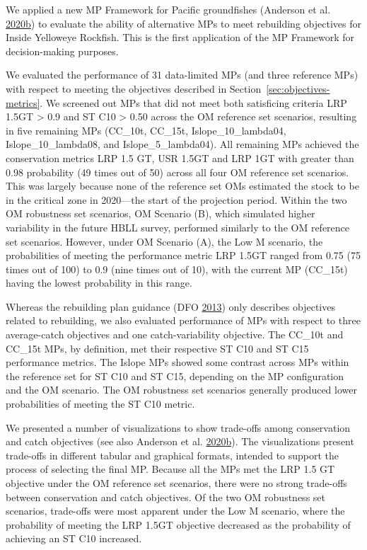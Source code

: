 \documentclass[11pt]{book}
\begin{document}
We applied a new MP Framework for Pacific groundfishes (Anderson et al. \protect\hyperlink{ref-anderson2020gfmp}{2020}\protect\hyperlink{ref-anderson2020gfmp}{b}) to evaluate the ability of alternative MPs to meet rebuilding objectives for Inside Yelloweye Rockfish. This is the first application of the MP Framework for decision-making purposes.

We evaluated the performance of 31 data-limited MPs (and three reference MPs) with respect to meeting the objectives described in Section~\ref{sec:objectives-metrics}. We screened out MPs that did not meet both satisficing criteria LRP 1.5GT \textgreater{} 0.9 and ST C10 \textgreater{} 0.50 across the OM reference set scenarios, resulting in five remaining MPs (CC\_10t, CC\_15t, Islope\_10\_lambda04, Islope\_10\_lambda08, and Islope\_5\_lambda04). All remaining MPs achieved the conservation metrics LRP 1.5 GT, USR 1.5GT and LRP 1GT with greater than 0.98 probability (49 times out of 50) across all four OM reference set scenarios. This was largely because none of the reference set OMs estimated the stock to be in the critical zone in 2020---the start of the projection period. Within the two OM robustness set scenarios, OM Scenario (B), which simulated higher variability in the future HBLL survey, performed similarly to the OM reference set scenarios. However, under OM Scenario (A), the Low M scenario, the probabilities of meeting the performance metric LRP 1.5GT ranged from 0.75 (75 times out of 100) to 0.9 (nine times out of 10), with the current MP (CC\_15t) having the lowest probability in this range.

Whereas the rebuilding plan guidance (DFO \protect\hyperlink{ref-dfo2013}{2013}) only describes objectives related to rebuilding, we also evaluated performance of MPs with respect to three average-catch objectives and one catch-variability objective. The CC\_10t and CC\_15t MPs, by definition, met their respective ST C10 and ST C15 performance metrics. The Islope MPs showed some contrast across MPs within the reference set for ST C10 and ST C15, depending on the MP configuration and the OM scenario. The OM robustness set scenarios generally produced lower probabilities of meeting the ST C10 metric.

We presented a number of visualizations to show trade-offs among conservation and catch objectives (see also Anderson et al. \protect\hyperlink{ref-anderson2020gfmp}{2020}\protect\hyperlink{ref-anderson2020gfmp}{b}). The visualizations present trade-offs in different tabular and graphical formats, intended to support the process of selecting the final MP. Because all the MPs met the LRP 1.5 GT objective under the OM reference set scenarios, there were no strong trade-offs between conservation and catch objectives. Of the two OM robustness set scenarios, trade-offs were most apparent under the Low M scenario, where the probability of meeting the LRP 1.5GT objective decreased as the probability of achieving an ST C10 increased.
\end{document}
